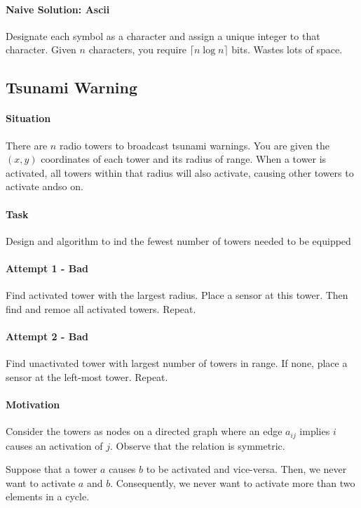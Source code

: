 \paragraph{Naive Solution: Ascii}
Designate each symbol as a character and assign a unique integer
to that character. Given \(n\) characters, you require
\(\lceil n \log n \rceil\)
bits.
Wastes lots of space.

\subsection{Tsunami Warning}

\paragraph{Situation}
There are \(n\) radio towers to broadcast tsunami warnings.
You are given the \((x, y)\) coordinates of each tower and its
radius of range. When a tower is activated, all towers within that radius
will also activate, causing other towers to activate andso on.

\paragraph{Task}
Design and algorithm to ind the fewest number of towers needed to be equipped

\paragraph{Attempt 1 - Bad}
Find activated tower with the largest radius. Place a sensor at this tower.
Then find and remoe all activated towers. Repeat.
\paragraph{Attempt 2 - Bad}
Find unactivated tower with largest number of towers in range. If none, place
a sensor at the left-most tower. Repeat.

\paragraph{Motivation}
Consider the towers as nodes on a directed graph where an edge \(a_{ij}\)
implies \(i\) causes an activation of \(j\). Observe that the relation is
symmetric.

Suppose that a tower \(a\) causes \(b\) to be activated and vice-versa.
Then, we never want to activate \(a\) and \(b\). Consequently,
we never want to activate more than two elements in a cycle.

